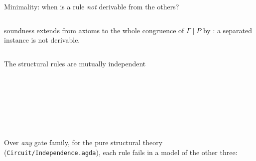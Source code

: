 \begin{frame}{Minimality: when is a rule \emph{not} derivable from the others? \New}
\begin{columns}[c]
\begin{column}{0.41\textwidth}
\vspace{6pt}
{\small soundness extends from axioms to the whole congruence of $\Gamma\mid P$
by : a separated instance is not derivable.}
\end{column}
\end{columns}
\end{frame}

\begin{frame}{The structural rules are mutually independent \New}
\begin{code}[hide]%
\>[0]\AgdaSpace{}%
\AgdaSpace{}%
\AgdaSymbol{:}\AgdaSpace{}%
\AgdaSpace{}%
\<%
\\
\>[0][@{}l@{\AgdaIndent{0}}]%
\>[2]\AgdaSpace{}%
\AgdaSpace{}%
\AgdaSpace{}%
\AgdaSpace{}%
\AgdaSymbol{:}\AgdaSpace{}%
\<%
\\
\>[0]\AgdaSpace{}%
\AgdaSpace{}%
\<%
\\
\>[0]\<%
\\
\>[0][@{}l@{\AgdaIndent{0}}]%
\>[2]\AgdaSpace{}%
\AgdaSymbol{:}\AgdaSpace{}%
\AgdaSpace{}%
\AgdaSymbol{\{}\AgdaSpace{}%
\AgdaSpace{}%
\AgdaSymbol{:}\AgdaSpace{}%
\AgdaSpace{}%
\AgdaSymbol{\}}\AgdaSpace{}%
\AgdaSpace{}%
\AgdaSpace{}%
\AgdaSpace{}%
\AgdaSpace{}%
\AgdaOperator{\AgdaDatatype{===}}\AgdaSpace{}%
\AgdaSpace{}%
\AgdaSpace{}%
\AgdaSpace{}%
\AgdaSpace{}%
\<%
\\
\>[0]\AgdaSpace{}%
\AgdaSpace{}%
\<%
\end{code}
\begin{columns}[c]
\begin{column}{0.56\textwidth}
\renewcommand{\AgdaCodeStyle}{\scriptsize}
\small Over \emph{any} gate family, for the pure structural theory
(\texttt{Circuit/Independence.agda}), each rule fails in a model of the other three:
\begin{code}%
\>[0][@{}l@{\AgdaIndent{1}}]%

\end{code}
\end{column}
\end{columns}
\end{frame}
